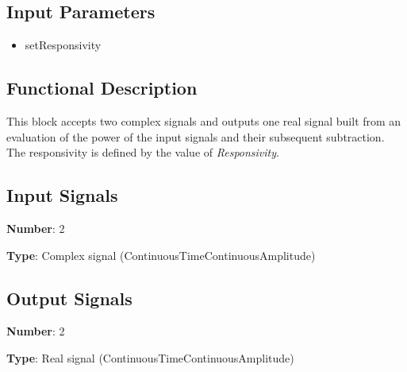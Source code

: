 \documentclass[../../sdf/tex/BPSK_system.tex]{subfiles}
\date{}
\begin{document}
\onlyinsubfile{\maketitle}

\subsection*{Input Parameters}

\begin{multicols}{2}
	\begin{itemize}
		\item setResponsivity
	\end{itemize}
\end{multicols}

\subsection*{Functional Description}

This block accepts two complex signals and outputs one real signal built from an evaluation of the power of the input signals and their subsequent subtraction. The responsivity is defined by the value of \textit{Responsivity}.


\subsection*{Input Signals}

\textbf{Number}: 2

\textbf{Type}: Complex signal (ContinuousTimeContinuousAmplitude)

\subsection*{Output Signals}

\textbf{Number}: 2

\textbf{Type}: Real signal (ContinuousTimeContinuousAmplitude)
\end{document}
